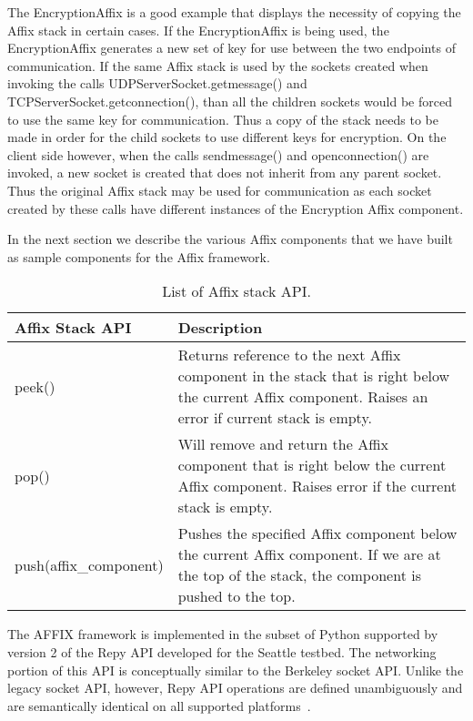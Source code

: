 The EncryptionAffix is a good example that displays the necessity of copying the Affix
stack in certain cases. If the EncryptionAffix is being used, the EncryptionAffix 
generates a new set of key for use between the two endpoints of communication. If 
the same Affix stack is used by the sockets created when invoking the calls 
UDPServerSocket.getmessage() and TCPServerSocket.getconnection(), than all the 
children sockets would be forced to use the same key for communication. Thus a 
copy of the stack needs to be made in order for the child sockets to use different
keys for encryption. On the client side however, when the calls sendmessage() and 
openconnection() are invoked, a new socket is created that does not inherit from
any parent socket. Thus the original Affix stack may be used for communication as
each socket created by these calls have different instances of the Encryption Affix
component.

In the next section we describe the various Affix components that we have built as
sample components for the Affix framework.
 

\begin{table}[t]
\scriptsize
\centering
\begin{tabular*}{\columnwidth}{|l|p{4.95cm}|}
\hline
Affix Stack API & Description \\ \hline
\hline
peek() & Returns reference to the next Affix component in the stack that is right below the current Affix component. Raises an error if current stack is empty.  \\ \hline
pop() & Will remove and return the Affix component that is right below the
current Affix component. Raises error if the current stack is empty.  \\ \hline
push(affix\_component) & Pushes the specified Affix component below the current
Affix component. If we are at the top of the stack, the component is pushed to 
the top. \\ \hline
\end{tabular*}
\caption{List of Affix stack API.}
\label{tab-affixstackapi} 
\end{table}
\fi

\iffalse


The AFFIX framework is implemented in the subset of Python supported by version 2 
of the Repy API developed for the Seattle testbed.  The networking portion 
of this API is conceptually similar to the 
Berkeley socket API. Unlike the legacy socket API, however, Repy API operations 
are defined unambiguously and are semantically identical on all 
supported platforms~\cite{RepyV2API}.

